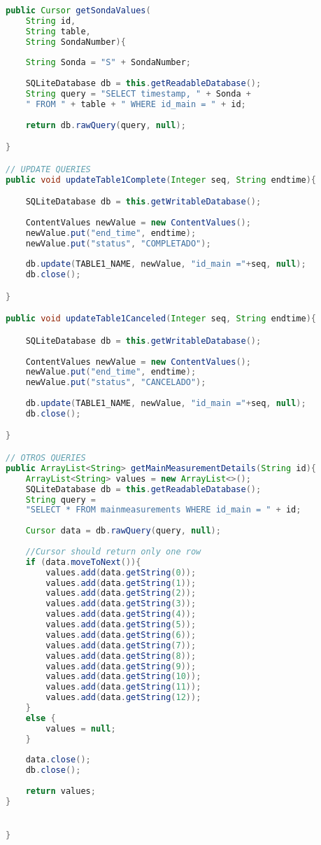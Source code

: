 \begin{lstlisting}[language=java, caption={Clase DatabaseHelper, crea la base de datos de no existir y contiene las consultas e inserciones a la misma}, captionpos=b, basicstyle=\small]
public Cursor getSondaValues(
	String id,
	String table, 
	String SondaNumber){
	
	String Sonda = "S" + SondaNumber;
	
	SQLiteDatabase db = this.getReadableDatabase();
	String query = "SELECT timestamp, " + Sonda + 
	" FROM " + table + " WHERE id_main = " + id;
	
	return db.rawQuery(query, null);

}

// UPDATE QUERIES
public void updateTable1Complete(Integer seq, String endtime){

	SQLiteDatabase db = this.getWritableDatabase();
	
	ContentValues newValue = new ContentValues();
	newValue.put("end_time", endtime);
	newValue.put("status", "COMPLETADO");
	
	db.update(TABLE1_NAME, newValue, "id_main ="+seq, null);
	db.close();

}

public void updateTable1Canceled(Integer seq, String endtime){

	SQLiteDatabase db = this.getWritableDatabase();
	
	ContentValues newValue = new ContentValues();
	newValue.put("end_time", endtime);
	newValue.put("status", "CANCELADO");
	
	db.update(TABLE1_NAME, newValue, "id_main ="+seq, null);
	db.close();

}

// OTROS QUERIES
public ArrayList<String> getMainMeasurementDetails(String id){
	ArrayList<String> values = new ArrayList<>();
	SQLiteDatabase db = this.getReadableDatabase();
	String query = 
	"SELECT * FROM mainmeasurements WHERE id_main = " + id;
	
	Cursor data = db.rawQuery(query, null);
	
	//Cursor should return only one row
	if (data.moveToNext()){
		values.add(data.getString(0));
		values.add(data.getString(1));
		values.add(data.getString(2));
		values.add(data.getString(3));
		values.add(data.getString(4));
		values.add(data.getString(5));
		values.add(data.getString(6));
		values.add(data.getString(7));
		values.add(data.getString(8));
		values.add(data.getString(9));
		values.add(data.getString(10));
		values.add(data.getString(11));
		values.add(data.getString(12));
	}
	else {
		values = null;
	}
	
	data.close();
	db.close();
	
	return values;
}


}

\end{lstlisting}

